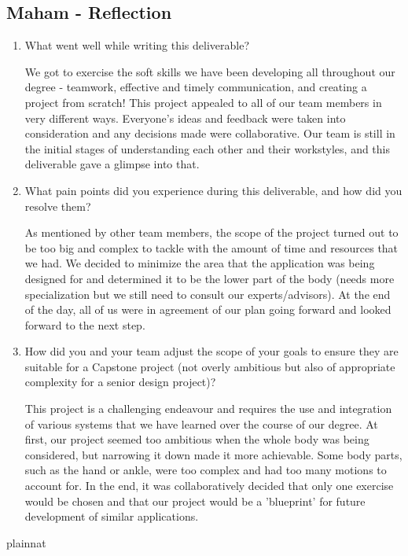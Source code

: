 \documentclass{article}
\begin{document}
\subsection*{Maham - Reflection}
\begin{enumerate}
    \item What went well while writing this deliverable? 

    We got to exercise the soft skills we have been developing all throughout our degree - teamwork, effective and timely
    communication, and creating a project from scratch! This project appealed to all of our team members in very different
    ways. Everyone’s ideas and feedback were taken into consideration and any decisions made were collaborative. Our team
    is still in the initial stages of understanding each other and their workstyles, and this deliverable gave a glimpse
    into that.

    \item What pain points did you experience during this deliverable, and how
    did you resolve them?

    As mentioned by other team members, the scope of the project turned out to be too big and complex to tackle with the
    amount of time and resources that we had. We decided to minimize the area that the application was being designed for
    and determined it to be the lower part of the body (needs more specialization but we still need to consult our
    experts/advisors). At the end of the day, all of us were in agreement of our plan going forward and looked forward
    to the next step.

    \item How did you and your team adjust the scope of your goals to ensure
    they are suitable for a Capstone project (not overly ambitious but also of
    appropriate complexity for a senior design project)?
    
    This project is a challenging endeavour and requires the use and integration of various systems that we have learned
    over the course of our degree. At first, our project seemed too ambitious when the whole body was being considered,
    but narrowing it down made it more achievable. Some body parts, such as the hand or ankle, were too complex and had
    too many motions to account for. In the end, it was collaboratively decided that only one exercise would be chosen
    and that our project would be a 'blueprint' for future development of similar applications. 
    
\end{enumerate}  

 {plainnat}

\end{document}
